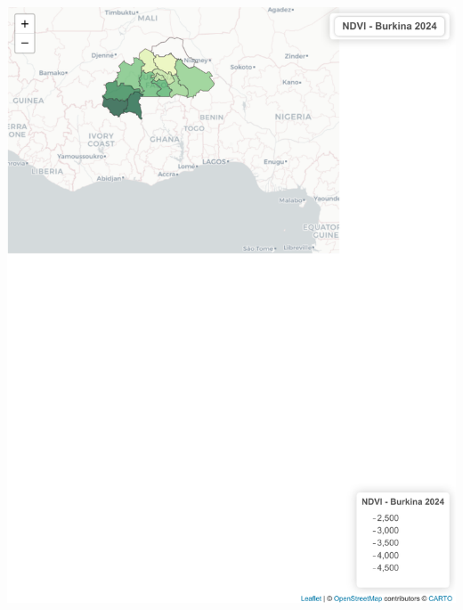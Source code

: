 \documentclass[
]{book}
\begin{document}
\includegraphics{Atlas-Spectral-Sahel_files/figure-latex/ndvi-cartes-2.pdf}
\end{document}
